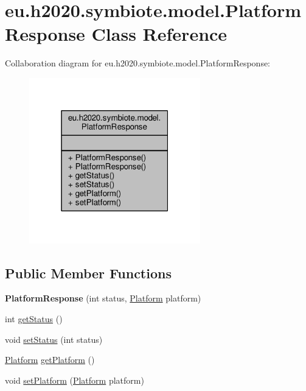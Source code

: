 \hypertarget{classeu_1_1h2020_1_1symbiote_1_1model_1_1PlatformResponse}{}\section{eu.\+h2020.\+symbiote.\+model.\+Platform\+Response Class Reference}
\label{classeu_1_1h2020_1_1symbiote_1_1model_1_1PlatformResponse}


Collaboration diagram for eu.\+h2020.\+symbiote.\+model.\+Platform\+Response\+:
\nopagebreak
\begin{figure}[H]
\begin{center}
\leavevmode
\includegraphics[width=211pt]{classeu_1_1h2020_1_1symbiote_1_1model_1_1PlatformResponse__coll__graph}
\end{center}
\end{figure}
\subsection*{Public Member Functions}
\begin{DoxyCompactItemize}
\item 
{\bfseries Platform\+Response} (int status, \hyperlink{classeu_1_1h2020_1_1symbiote_1_1model_1_1Platform}{Platform} platform)\hypertarget{classeu_1_1h2020_1_1symbiote_1_1model_1_1PlatformResponse_a50bf9ab9f6e33d7867ae3b9f45f5a857}{}\label{classeu_1_1h2020_1_1symbiote_1_1model_1_1PlatformResponse_a50bf9ab9f6e33d7867ae3b9f45f5a857}

\item 
int \hyperlink{classeu_1_1h2020_1_1symbiote_1_1model_1_1PlatformResponse_a36426fc2903fd48bb259295fb8421b9a}{get\+Status} ()
\item 
void \hyperlink{classeu_1_1h2020_1_1symbiote_1_1model_1_1PlatformResponse_a5266400d912196cf753e8c9ee40af151}{set\+Status} (int status)
\item 
\hyperlink{classeu_1_1h2020_1_1symbiote_1_1model_1_1Platform}{Platform} \hyperlink{classeu_1_1h2020_1_1symbiote_1_1model_1_1PlatformResponse_acf4b4148d28e4fcf1e041e1a58937ac3}{get\+Platform} ()
\item 
void \hyperlink{classeu_1_1h2020_1_1symbiote_1_1model_1_1PlatformResponse_ae3bfb1ea81733222dae4118c68b7917e}{set\+Platform} (\hyperlink{classeu_1_1h2020_1_1symbiote_1_1model_1_1Platform}{Platform} platform)
\end{DoxyCompactItemize}


